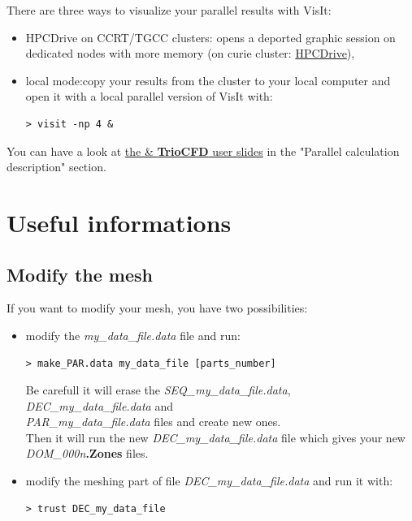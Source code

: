 There are three ways to visualize your parallel results with VisIt:
\begin{itemize}
\item HPCDrive on CCRT/TGCC clusters: opens a deported graphic session on dedicated nodes with more memory (on curie cluster: \href{https://visu-tgcc.ccc.cea.fr/HPCDrive/home}{HPCDrive}),
\item local mode:copy your results from the cluster to your local computer and open it with a local parallel version of VisIt with:
\begin{verbatim}
> visit -np 4 &
\end{verbatim}
\end{itemize}

You can have a look at \href{TRUST_and_TrioCFD_presentation.pdf}{the \trust \& \textbf{TrioCFD} user slides} in the "Parallel calculation description" section.




\section{Useful informations}
\subsection{Modify the mesh}
If you want to modify your mesh, you have two possibilities:
\begin{itemize} 
\item modify the \textit{my\_data\_file.data} file and run:
\begin{verbatim}
> make_PAR.data my_data_file [parts_number]
\end{verbatim}
Be carefull it will erase the \textit{SEQ\_my\_data\_file.data}, \textit{DEC\_my\_data\_file.data} and \\
\textit{PAR\_my\_data\_file.data} files and create new ones.\\
Then it will run the new \textit{DEC\_my\_data\_file.data} file which gives your new \textit{DOM\_000n}\textbf{.Zones} files.

\item modify the meshing part of file \textit{DEC\_my\_data\_file.data} and run it with:
\begin{verbatim}
> trust DEC_my_data_file
\end{verbatim}
\end{itemize}

